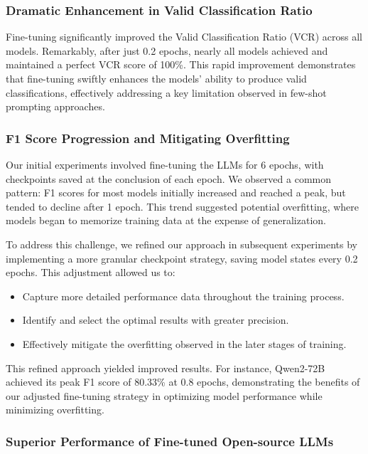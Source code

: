 \documentclass[conference]{IEEEtran}
\begin{document}
\subsubsection{Dramatic Enhancement in Valid Classification Ratio}
Fine-tuning significantly improved the Valid Classification Ratio (VCR) across all models. Remarkably, after just 0.2 epochs, nearly all models achieved and maintained a perfect VCR score of 100\%. This rapid improvement demonstrates that fine-tuning swiftly enhances the models' ability to produce valid classifications, effectively addressing a key limitation observed in few-shot prompting approaches.

\subsubsection{F1 Score Progression and Mitigating Overfitting}
Our initial experiments involved fine-tuning the LLMs for 6 epochs, with checkpoints saved at the conclusion of each epoch. We observed a common pattern: F1 scores for most models initially increased and reached a peak, but tended to decline after 1 epoch. This trend suggested potential overfitting, where models began to memorize training data at the expense of generalization.

To address this challenge, we refined our approach in subsequent experiments by implementing a more granular checkpoint strategy, saving model states every 0.2 epochs. This adjustment allowed us to:

\begin{itemize}
    \item Capture more detailed performance data throughout the training process.
    \item Identify and select the optimal results with greater precision.
    \item Effectively mitigate the overfitting observed in the later stages of training.
\end{itemize}

This refined approach yielded improved results. For instance, Qwen2-72B achieved its peak F1 score of 80.33\% at 0.8 epochs, demonstrating the benefits of our adjusted fine-tuning strategy in optimizing model performance while minimizing overfitting.

\subsubsection{Superior Performance of Fine-tuned Open-source LLMs}
\end{document}
